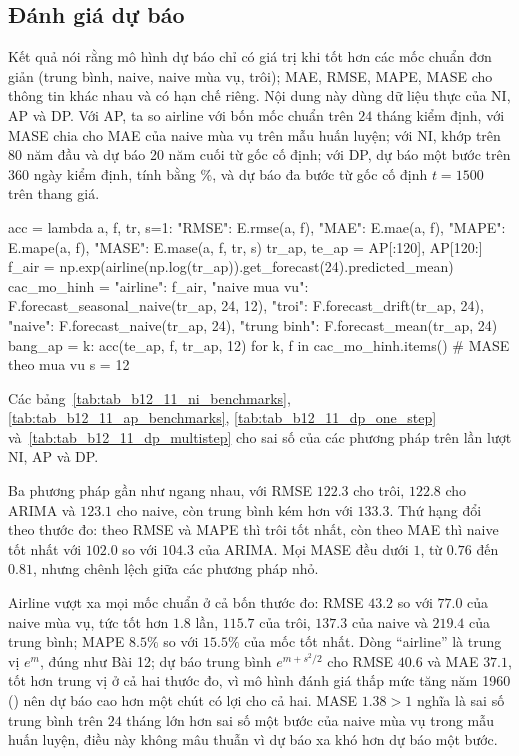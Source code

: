 \subsection{Đánh giá dự báo}

 Kết quả  nói rằng mô hình dự báo chỉ có giá trị khi tốt hơn các mốc chuẩn đơn giản (trung bình, naive, naive mùa vụ, trôi); MAE, RMSE, MAPE, MASE cho thông tin khác nhau và có hạn chế riêng.
 Nội dung này dùng dữ liệu thực của NI, AP và DP. Với AP, ta so airline với bốn mốc chuẩn trên $24$ tháng kiểm định, với MASE chia cho MAE của naive mùa vụ trên mẫu huấn luyện; với NI, khớp trên 80 năm đầu và dự báo 20 năm cuối từ gốc cố định; với DP, dự báo một bước trên $360$ ngày kiểm định, tính bằng \%, và dự báo đa bước từ gốc cố định $t=1500$ trên thang giá.
\begin{codeblock}
acc = lambda a, f, tr, s=1: {"RMSE": E.rmse(a, f), "MAE": E.mae(a, f),
                              "MAPE": E.mape(a, f), "MASE": E.mase(a, f, tr, s)}
tr_ap, te_ap = AP[:120], AP[120:]
f_air = np.exp(airline(np.log(tr_ap)).get_forecast(24).predicted_mean)
cac_mo_hinh = {"airline": f_air, "naive mua vu": F.forecast_seasonal_naive(tr_ap, 24, 12),
               "troi": F.forecast_drift(tr_ap, 24), "naive": F.forecast_naive(tr_ap, 24),
               "trung binh": F.forecast_mean(tr_ap, 24)}
bang_ap = {k: acc(te_ap, f, tr_ap, 12) for k, f in cac_mo_hinh.items()}   # MASE theo mua vu s = 12
\end{codeblock}
 Các bảng~\ref{tab:tab_b12_11_ni_benchmarks}, \ref{tab:tab_b12_11_ap_benchmarks}, \ref{tab:tab_b12_11_dp_one_step} và~\ref{tab:tab_b12_11_dp_multistep} cho sai số của các phương pháp trên lần lượt NI, AP và DP.




 Ba phương pháp gần như ngang nhau, với RMSE $122.3$ cho trôi, $122.8$ cho ARIMA và $123.1$ cho naive, còn trung bình kém hơn với $133.3$. Thứ hạng đổi theo thước đo: theo RMSE và MAPE thì trôi tốt nhất, còn theo MAE thì naive tốt nhất với $102.0$ so với $104.3$ của ARIMA. Mọi MASE đều dưới $1$, từ $0.76$ đến $0.81$, nhưng chênh lệch giữa các phương pháp nhỏ.

 Airline vượt xa mọi mốc chuẩn ở cả bốn thước đo: RMSE $43.2$ so với $77.0$ của naive mùa vụ, tức tốt hơn $1.8$ lần, $115.7$ của trôi, $137.3$ của naive và $219.4$ của trung bình; MAPE $8.5\%$ so với $15.5\%$ của mốc tốt nhất. Dòng ``airline'' là trung vị $e^{m}$, đúng như Bài 12; dự báo trung bình $e^{m+s^2/2}$ cho RMSE $40.6$ và MAE $37.1$, tốt hơn trung vị ở cả hai thước đo, vì mô hình đánh giá thấp mức tăng năm 1960 () nên dự báo cao hơn một chút có lợi cho cả hai. MASE $1.38>1$ nghĩa là sai số trung bình trên $24$ tháng lớn hơn sai số một bước của naive mùa vụ trong mẫu huấn luyện, điều này không mâu thuẫn vì dự báo xa khó hơn dự báo một bước.

